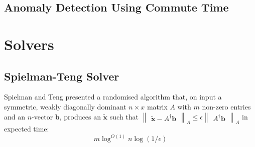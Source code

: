 \subsection{Anomaly Detection Using Commute Time}

\section{Solvers}

\subsection{Spielman-Teng Solver}
\nocite{SPIELMANTANG09}
Spielman and Teng presented a randomised algorithm that, on input a symmetric, 
weakly diagonally dominant $n{\times}x$ matrix $A$ with $m$ non-zero entries and
an $n$-vector $\mathbf{b}$, produces an $\tilde{\mathbf{x}}$ such that 
$\begin{Vmatrix} \tilde{\textbf{x}} - A^{\dagger}\textbf{b} \end{Vmatrix}_{A} 
\leq \epsilon \begin{Vmatrix} A^{\dagger}\mathbf{b} \end{Vmatrix}_{A}$ in 
expected time:
\begin{displaymath}
m \log^{O(1)} n \log (1/\epsilon)
\end{displaymath}
